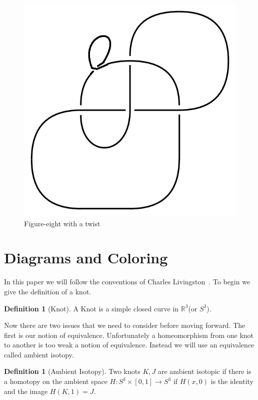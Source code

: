 \documentclass[12pt]{amsart}
\theoremstyle{definition}
\newtheorem{definition}[theorem]{Definition}
\theoremstyle{remark}
\numberwithin{equation}{section}
\newcommand{\bb}[1]{\mathbb{#1}}
\newcommand{\ds}{.3}
\begin{document}
\begin{figure}
  \includegraphics[scale=\ds]{figure-eight-t}
  \caption{Figure-eight with a twist}
  \label{fig:figure-eight-t}
\end{figure}

\section{Diagrams and Coloring}
\label{sec:diagrams-coloring}

In this paper we will follow the conventions of Charles
Livingston~\cite{Livingston}. To begin we give the definition of a knot.

\begin{definition}[Knot]
  A Knot is a simple closed curve in $\bb{R}^3$(or $S^3$).
\end{definition}

Now there are two issues that we need to consider before moving forward.
The first is our notion of equivalence. Unfortunately a homeomorphism from
one knot to another is too weak a notion of equivalence. Instead we will
use an equivalence called ambient isotopy.

\begin{definition}[Ambient Isotopy]
  Two knots $K,J$ are ambient isotopic if there is a homotopy on the ambient
  space $H:S^3\times [0,1]\rightarrow S^3$ if $H(x,0)$ is the identity and the
  image $H(K,1)=J$.
\end{definition}
\end{document}
